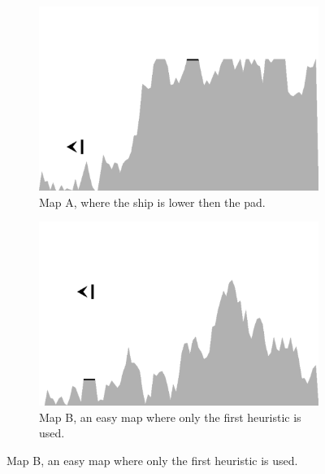 \documentclass[conference]{IEEEtran}
\begin{document}
       




\begin{figure}[ht]
  \centering



  \centering
        \begin{subfigure}{0.49\textwidth}
                \centering
                \includegraphics[width=1.0\textwidth]{./graphics/map2.pdf}
                \caption{Map A,  where the ship is lower then the pad.}
                \label{fig:map2}
        \end{subfigure}  
        \begin{subfigure}{0.49\textwidth}
                \centering
                \includegraphics[width=1.0\textwidth]{./graphics/map1-easy.pdf}
                \caption{Map B, an easy map where only the first heuristic is used.}
                \label{fig:map1-easy}


\end{subfigure}
\end{figure}
\end{document}
